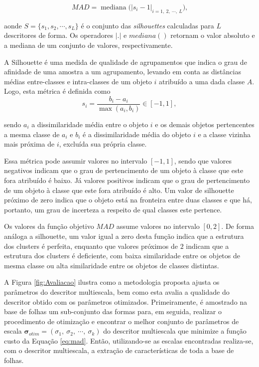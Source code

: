 \begin{equation}
\label{eq:mad}
MAD = \operatorname{mediana}\big(|s_i - 1|_{i =1,\:2,\:\cdots,\:L}\big)\text{,}
\end{equation}

\noindent aonde $S = \{s_1,s_2,\cdots,s_L\}$ é o conjunto das \emph{silhouettes} calculadas para $L$ descritores de forma. Os operadores $|.|$  e {$mediana ( )$} retornam o valor absoluto e a mediana de um conjunto de valores, respectivamente.

A Silhouette \cite{Rousseeuw:1987} é uma medida de qualidade de agrupamentos que indica o grau de afinidade de uma amostra  a um agrupamento, levando em conta as distâncias médias entre-classes e intra-classes de um objeto $i$ atribuído a uma dada classe $A$. Logo, esta métrica é definida como 
\begin{equation}
s_i = \frac{b_i - a_i}{\max{(a_i,b_i)}} \in [-1,1],
\end{equation}

\noindent sendo $a_i$ a dissimilaridade média entre o objeto $i$ e os demais objetos pertencentes a mesma classe de $a_i$ e $b_i$ é a dissimilaridade média do objeto $i$ e a classe vizinha mais próxima de $i$, excluída sua própria classe. 

Essa métrica pode assumir valores no intervalo $[-1,1]$, sendo que valores negativos indicam que o grau de pertencimento de um objeto à classe que este fora atribuído é baixo. Já valores positivos indicam que o grau de pertencimento de um objeto à classe que este fora atribuído é alto. Um valor de silhouette próximo de zero indica que o objeto está na fronteira entre duas classes e que há, portanto, um grau de incerteza a respeito de qual classes este pertence.

Os valores da função objetivo $MAD$ assume valores no intervalo $[0,2]$. De forma análoga a silhouette, um valor igual a zero desta função indica que a estrutura dos clusters é perfeita, enquanto que valores próximos de $2$ indicam que a estrutura dos clusters é deficiente, com baixa similaridade entre os objetos de mesma classe ou alta similaridade entre os objetos de classes distintas.

A Figura  \ref{fig:Avaliacao} ilustra como a metodologia proposta ajusta os parâmetros do descritor multiescala, bem como esta avalia a qualidade do descritor obtido com os parâmetros otimizados. Primeiramente, é amostrado na base de folhas um sub-conjunto das formas para, em seguida, realizar o procedimento de otimização e encontrar o melhor conjunto de parâmetros de escala  $\boldsymbol{\sigma}_{otim} = (\sigma_1,\:\sigma_2,\:\cdots,\:\sigma_k)$ do descritor multiescala que minimize a função custo da Equação \ref{eq:mad}. Então, utilizando-se as escalas encontradas realiza-se, com o descritor multiescala, a extração de características de toda a base de folhas.

